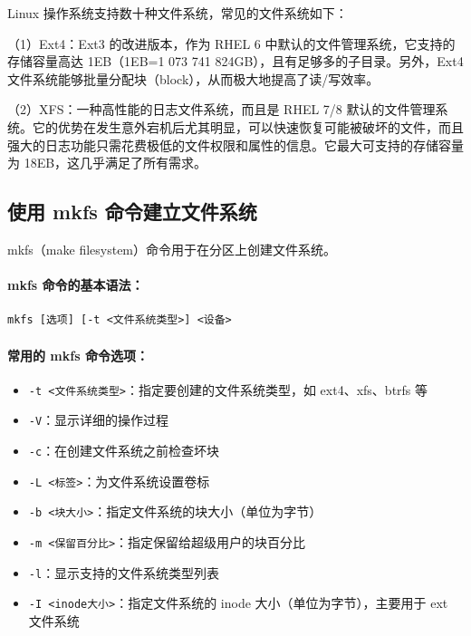 \documentclass[12pt,UTF8]{ctexbook}
\begin{document}
Linux 操作系统支持数十种文件系统，常见的文件系统如下：

（1）Ext4：Ext3 的改进版本，作为 RHEL 6 中默认的文件管理系统，它支持的存储容量高达 1EB（1EB=1 073 741 824GB），且有足够多的子目录。另外，Ext4 文件系统能够批量分配块（block），从而极大地提高了读/写效率。

（2）XFS：一种高性能的日志文件系统，而且是 RHEL 7/8 默认的文件管理系统。它的优势在发生意外宕机后尤其明显，可以快速恢复可能被破坏的文件，而且强大的日志功能只需花费极低的文件权限和属性的信息。它最大可支持的存储容量为 18EB，这几乎满足了所有需求。

\subsection{使用 mkfs 命令建立文件系统}
mkfs（make filesystem）命令用于在分区上创建文件系统。

\paragraph{mkfs 命令的基本语法：}
\begin{verbatim}
mkfs [选项] [-t <文件系统类型>] <设备>
\end{verbatim}

\paragraph{常用的 mkfs 命令选项：}
\begin{itemize}
    \item \verb+-t <文件系统类型>+：指定要创建的文件系统类型，如 ext4、xfs、btrfs 等
    \item \verb+-V+：显示详细的操作过程
    \item \verb+-c+：在创建文件系统之前检查坏块
    \item \verb+-L <标签>+：为文件系统设置卷标
    \item \verb+-b <块大小>+：指定文件系统的块大小（单位为字节）
    \item \verb+-m <保留百分比>+：指定保留给超级用户的块百分比
    \item \verb+-l+：显示支持的文件系统类型列表
    \item \verb+-I <inode大小>+：指定文件系统的 inode 大小（单位为字节），主要用于 ext 文件系统
\end{itemize}
\end{document}
